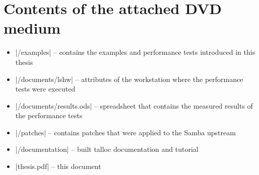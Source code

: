 \chapter{Contents of the attached DVD medium}

\begin{itemize}
  \item |/examples| -- contains the examples and performance tests introduced in
  this thesis
  \item |/documents/lshw| -- attributes of the workstation where the performance
  tests were executed
  \item |/documents/results.ods| -- spreadsheet that contains the measured
  results of the performance tests
  \item |/patches| -- contains patches that were applied to the Samba upstream
  \item |/documentation| -- built talloc documentation and tutorial
  \item |thesis.pdf| -- this document
\end{itemize}

